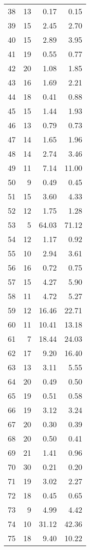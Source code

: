 \begin{longtable}{c r r r}
   38 & 13  & 0.17 & 0.15 \\ 
   39 & 15  & 2.45 & 2.70 \\ 
   40 & 15  & 2.89 & 3.95 \\ 
   41 & 19  & 0.55 & 0.77 \\ 
   42 & 20  & 1.08 & 1.85 \\ 
   43 & 16  & 1.69 & 2.21 \\ 
   44 & 18  & 0.41 & 0.88 \\ 
   45 & 15  & 1.44 & 1.93 \\ 
   46 & 13  & 0.79 & 0.73 \\ 
   47 & 14  & 1.65 & 1.96 \\ 
   48 & 14  & 2.74 & 3.46 \\ 
   49 & 11  & 7.14 & 11.00 \\ 
   50 & 9  & 0.49 & 0.45 \\ 
   51 & 15  & 3.60 & 4.33 \\ 
   52 & 12  & 1.75 & 1.28 \\ 
   53 & 5  & 64.03 & 71.12 \\ 
   54 & 12  & 1.17 & 0.92 \\ 
   55 & 10  & 2.94 & 3.61 \\ 
   56 & 16  & 0.72 & 0.75 \\ 
   57 & 15  & 4.27 & 5.90 \\ 
   58 & 11  & 4.72 & 5.27 \\ 
   59 & 12  & 16.46 & 22.71 \\ 
   60 & 11  & 10.41 & 13.18 \\ 
   61 & 7  & 18.44 & 24.03 \\ 
   62 & 17  & 9.20 & 16.40 \\ 
   63 & 13  & 3.11 & 5.55 \\ 
   64 & 20  & 0.49 & 0.50 \\ 
   65 & 19  & 0.51 & 0.58 \\ 
   66 & 19  & 3.12 & 3.24 \\ 
   67 & 20  & 0.30 & 0.39 \\ 
   68 & 20  & 0.50 & 0.41 \\ 
   69 & 21  & 1.41 & 0.96 \\ 
   70 & 30  & 0.21 & 0.20 \\ 
   71 & 19  & 3.02 & 2.27 \\ 
   72 & 18  & 0.45 & 0.65 \\ 
   73 & 9  & 4.99 & 4.42 \\ 
   74 & 10  & 31.12 & 42.36 \\ 
   75 & 18  & 9.40 & 10.22 \\ 

\end{longtable}

